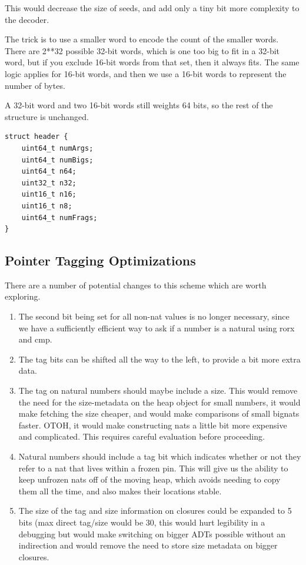 This would decrease the size of seeds, and add only a tiny bit more
complexity to the decoder.

The trick is to use a smaller word to encode the count of the smaller
words.  There are 2**32 possible 32-bit words, which is one too big to
fit in a 32-bit word, but if you exclude 16-bit words from that set,
then it always fits.  The same logic applies for 16-bit words, and then
we use a 16-bit words to represent the number of bytes.

A 32-bit word and two 16-bit words still weights 64 bits, so the rest
of the structure is unchanged.

\begin{verbatim}
struct header {
    uint64_t numArgs;
    uint64_t numBigs;
    uint64_t n64;
    uint32_t n32;
    uint16_t n16;
    uint16_t n8;
    uint64_t numFrags;
}
\end{verbatim}

\subsection{Pointer Tagging Optimizations}

There are a number of potential changes to this scheme which are worth
exploring.

\begin{enumerate}
\item
  The second bit being set for all non-nat values is no longer necessary,
  since we have a sufficiently efficient way to ask if a number is a
  natural using rorx and cmp.
\item
  The tag bits can be shifted all the way to the left, to provide a
  bit more extra data.
\item
  The tag on natural numbers should maybe include a size. This would
  remove the need for the size-metadata on the heap object for small
  numbers, it would make fetching the size cheaper, and would make
  comparisons of small bignats faster.  OTOH, it would make constructing
  nats a little bit more expensive and complicated.  This requires
  careful evaluation before proceeding.
\item
  Natural numbers should include a tag bit which indicates whether or
  not they refer to a nat that lives within a frozen pin.  This will
  give us the ability to keep unfrozen nats off of the moving heap, which
  avoids needing to copy them all the time, and also makes their
  locations stable.
\item
  The size of the tag and size information on closures could be expanded
  to 5 bits (max direct tag/size would be 30, this would hurt legibility
  in a debugging but would make switching on bigger ADTs possible without
  an indirection and would remove the need to store size metadata on
  bigger closures.
\end{enumerate}

